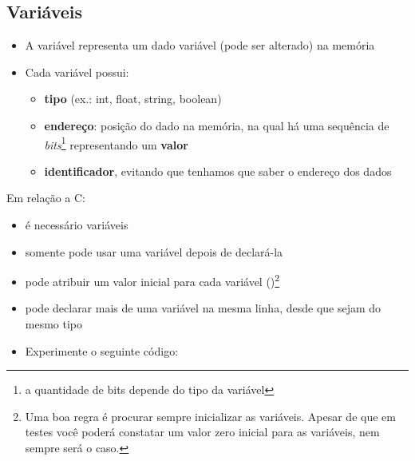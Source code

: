 \documentclass[portuguese,10pt,xcolor=table]{beamer}
\begin{document}
\subsection{Variáveis}

	\begin{frame}
		\begin{itemize}
			\item A variável representa um dado variável (pode ser alterado) na memória
			\item Cada variável possui:
				\begin{itemize}
			\item \textbf{tipo} (ex.: int, float, string, boolean)
			\item \textbf{endereço}: posição do dado na memória, na qual há uma sequência de \textit{bits}\footnote{a quantidade de bits depende do tipo da variável} representando um \textbf{valor}
			\item \textbf{identificador}, evitando que tenhamos que saber o endereço dos dados
				\end{itemize}
		\end{itemize}
	\end{frame}


	\begin{frame}
		Em relação a C:
		\begin{itemize}
			\item é necessário  variáveis
	        
			\item somente pode usar uma variável depois de declará-la
			\item pode atribuir um valor inicial para cada variável ()\footnote{Uma boa regra é procurar sempre inicializar as variáveis. Apesar de que em testes você poderá constatar um valor zero inicial para as variáveis, nem sempre será o caso.}
			\item pode declarar mais de uma variável na mesma linha, desde que sejam do mesmo tipo
		\end{itemize}
	\end{frame}

	
	\begin{frame}
	  \begin{itemize}
	      \item Experimente o seguinte código:
	        
	  \end{itemize}
	\end{frame}
\end{document}
